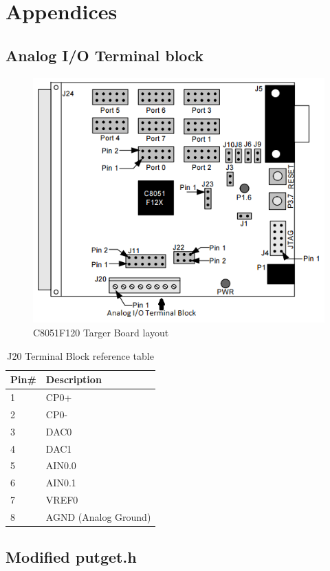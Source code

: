 \documentclass[12pt]{article}
\begin{document}
\pagebreak
\section{Appendices}
\subsection{Analog I/O Terminal block}
	\begin{figure}[H]
		\centering
		\includegraphics[]{board.png}
		\caption{C8051F120 Targer Board layout}
		\label{board layout}
	\end{figure} 
	\begin{table}[h]
		\centering
		\begin{tabular}{|l|l|}
			\hline
			Pin\# & Description \\ \hline
			1 & CP0+\\ \hline
			2 & CP0-\\ \hline
			3 & DAC0\\ \hline
			4 & DAC1\\ \hline
			5 & AIN0.0\\ \hline
			6 & AIN0.1\\ \hline
			7 & VREF0\\ \hline
			8 & AGND (Analog Ground)\\ \hline
		\end{tabular}
		\caption{J20 Terminal Block reference table}
		\label{refTable}
	\end{table}
\subsection{Modified putget.h}
	
\end{document}
